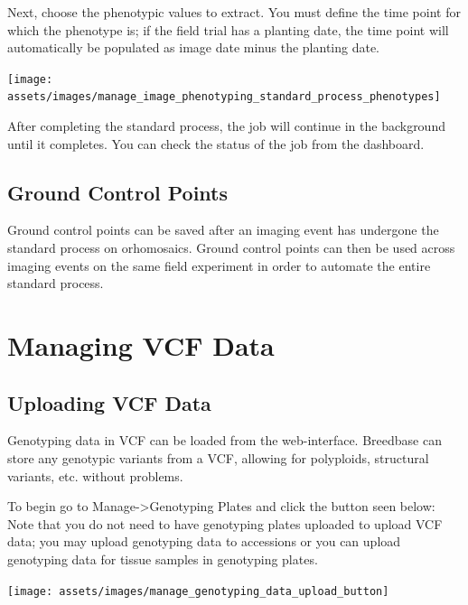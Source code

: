 \documentclass[
  12pt,
]{book}
\begin{document}
Next, choose the phenotypic values to extract. You must define the time point for which the phenotype is; if the field trial has a planting date, the time point will automatically be populated as image date minus the planting date.

\begin{center}\texttt{[image: assets/images/manage\_image\_phenotyping\_standard\_process\_phenotypes]} \end{center}

After completing the standard process, the job will continue in the background until it completes. You can check the status of the job from the dashboard.

\hypertarget{ground-control-points}{%
\section{Ground Control Points}\label{ground-control-points}}

Ground control points can be saved after an imaging event has undergone the standard process on orhomosaics. Ground control points can then be used across imaging events on the same field experiment in order to automate the entire standard process.

\hypertarget{managing-vcf-data}{%
\chapter{Managing VCF Data}\label{managing-vcf-data}}

\hypertarget{uploading-vcf-data}{%
\section{Uploading VCF Data}\label{uploading-vcf-data}}

Genotyping data in VCF can be loaded from the web-interface. Breedbase can store any genotypic variants from a VCF, allowing for polyploids, structural variants, etc. without problems.

To begin go to Manage-\textgreater Genotyping Plates and click the button seen below: Note that you do not need to have genotyping plates uploaded to upload VCF data; you may upload genotyping data to accessions or you can upload genotyping data for tissue samples in genotyping plates.

\begin{center}\texttt{[image: assets/images/manage\_genotyping\_data\_upload\_button]} \end{center}
\end{document}
